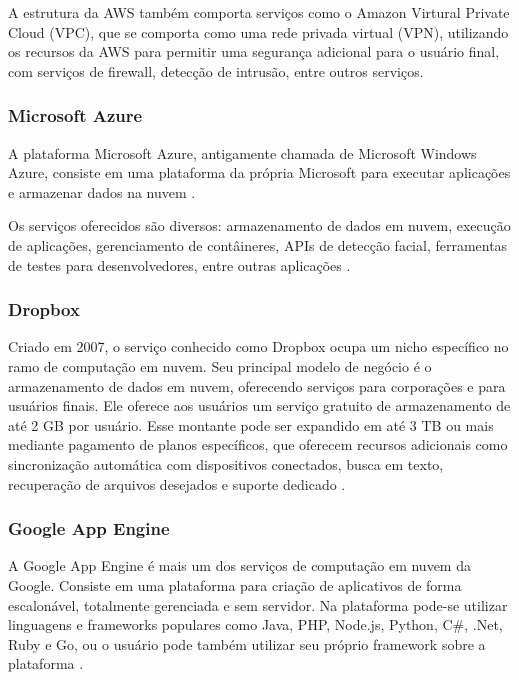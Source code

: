 \documentclass[
	12pt,				%
	oneside,			%
	a4paper,			%
	chapter=TITLE,		%
	english,			%
	french,				%
	spanish,			%
	brazil				%
	]{abntex2}
\begin{document}
A estrutura da AWS também comporta serviços como o Amazon Virtural Private Cloud (VPC), que se comporta como uma rede privada virtual (VPN), utilizando os recursos da AWS para permitir uma segurança adicional para o usuário final, com serviços de firewall, detecção de intrusão, entre outros serviços.

\subsubsection{Microsoft Azure}

A plataforma Microsoft Azure, antigamente chamada de Microsoft Windows Azure, consiste em uma plataforma da própria Microsoft para executar aplicações e armazenar dados na nuvem \cite{chappell2009introducing}.

Os serviços oferecidos são diversos: armazenamento de dados em nuvem, execução de aplicações, gerenciamento de contâineres, APIs de detecção facial, ferramentas de testes para desenvolvedores, entre outras aplicações \cite{microsoftazure}. 

\subsubsection{Dropbox}

Criado em 2007, o serviço conhecido como Dropbox \cite{dropbox} ocupa um nicho específico no ramo de computação em nuvem. Seu principal modelo de negócio é o armazenamento de dados em nuvem, oferecendo serviços para corporações e para usuários finais. Ele oferece aos usuários um serviço gratuito de armazenamento de até 2 GB por usuário. Esse montante pode ser expandido em até 3 TB ou mais mediante pagamento de planos específicos, que oferecem recursos adicionais como sincronização automática com dispositivos conectados, busca em texto, recuperação de arquivos desejados e suporte dedicado \cite{dropboxplans}.

\subsubsection{Google App Engine}

A Google App Engine é mais um dos serviços de computação em nuvem da Google. Consiste em uma plataforma para criação de aplicativos de forma escalonável, totalmente gerenciada e sem servidor. Na plataforma pode-se utilizar linguagens e frameworks populares como Java, PHP, Node.js, Python, C\#, .Net, Ruby e Go, ou o usuário pode também utilizar seu próprio framework sobre a plataforma \cite{googleapp}.
\end{document}
